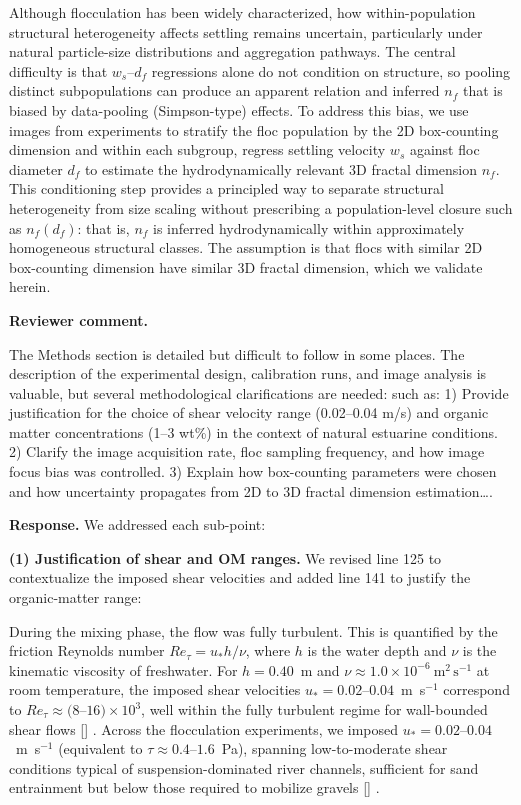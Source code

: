 \documentclass[11pt]{article}
\makeatletter
\newenvironment{Snippet}{%
  \par\vspace{0.3em}\begin{list}{}{\setlength{\leftmargin}{1em}\setlength{\rightmargin}{0.5em}}\item\small\itshape
}{%
  \end{list}\vspace{0.3em}
}
\newcommand{\citelookup}[1]{%
  \ifcsname cite@#1\endcsname\csname cite@#1\endcsname\else #1\fi
}
\newcommand{\citeformat}[1]{%
  \def\citelist{}%
  \forcsvlist{\addtocitelist}{#1}%
  \textup{[\citelist]}%
}
\newcommand{\addtocitelist}[1]{%
  \ifx\citelist\empty
    \edef\citelist{\citelookup{#1}}%
  \else
    \edef\citelist{\citelist;\space\citelookup{#1}}%
  \fi
}
\renewcommand{\cite}[1]{\citeformat{#1}}
\makeatother
\begin{document}
\begin{enumerate}[label=\textbf{R1.\arabic*.}]
\begin{Snippet}
Although flocculation has been widely characterized, how within-population structural heterogeneity affects settling remains uncertain, particularly under natural particle-size distributions and aggregation pathways. The central difficulty is that $w_s$--$d_f$ regressions alone do not condition on structure, so pooling distinct subpopulations can produce an apparent relation and inferred $n_f$ that is biased by data-pooling (Simpson-type) effects. To address this bias, we use images from experiments to stratify the floc population by the 2D box-counting dimension and within each subgroup, regress settling velocity $w_s$ against floc diameter $d_f$ to estimate the hydrodynamically relevant 3D fractal dimension $n_f$. This conditioning step provides a principled way to separate structural heterogeneity from size scaling without prescribing a population-level closure such as $n_f(d_f)$: that is, $n_f$ is inferred hydrodynamically within approximately homogeneous structural classes. The assumption is that flocs with similar 2D box-counting dimension have similar 3D fractal dimension, which we validate herein.
\end{Snippet}

\item \textbf{Reviewer comment.}
\begin{Snippet}
The Methods section is detailed but difficult to follow in some places. The description of the experimental design, calibration runs, and image analysis is valuable, but several methodological clarifications are needed: such as: 1) Provide justification for the choice of shear velocity range (0.02--0.04 m/s) and organic matter concentrations (1--3 wt\%) in the context of natural estuarine conditions. 2) Clarify the image acquisition rate, floc sampling frequency, and how image focus bias was controlled. 3) Explain how box-counting parameters were chosen and how uncertainty propagates from 2D to 3D fractal dimension estimation\ldots.
\end{Snippet}
\textbf{Response.} We addressed each sub-point:

\textbf{(1) Justification of shear and OM ranges.} We revised line 125 to contextualize the imposed shear velocities and added line 141 to justify the organic-matter range:
\begin{Snippet}
During the mixing phase, the flow was fully turbulent. This is quantified by the friction Reynolds number $Re_{\tau} = u_* h / \nu$, where $h$ is the water depth and $\nu$ is the kinematic viscosity of freshwater. For $h = 0.40$~m and $\nu \approx 1.0 \times 10^{-6}\ \mathrm{m^2\,s^{-1}}$ at room temperature, the imposed shear velocities $u_* = 0.02$--$0.04$~m~s$^{-1}$ correspond to $Re_{\tau} \approx (8$--$16)\times10^{3}$, well within the fully turbulent regime for wall-bounded shear flows \cite{Pope2000, Schlichting2000}. Across the flocculation experiments, we imposed $u_* = 0.02$--$0.04$~m~s$^{-1}$ (equivalent to $\tau \approx 0.4$--$1.6$~Pa), spanning low-to-moderate shear conditions typical of suspension-dominated river channels, sufficient for sand entrainment but below those required to mobilize gravels \cite{julien2018river}.
\end{Snippet}


\end{enumerate}
\end{document}

